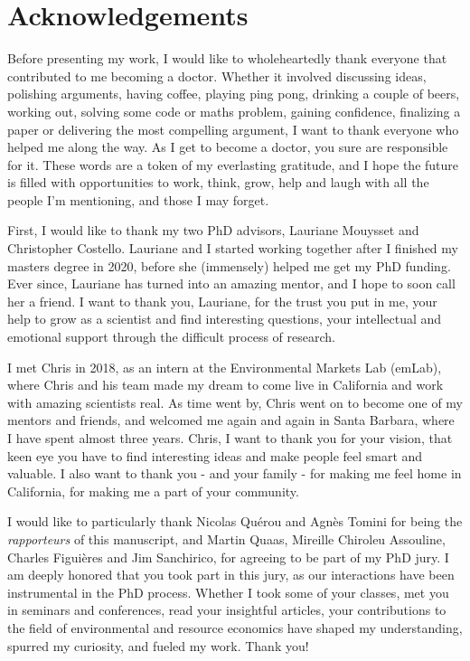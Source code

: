 \chapter*{Acknowledgements}
\onehalfspacing

Before presenting my work, I would like to wholeheartedly thank everyone that contributed to me becoming a doctor. Whether it involved discussing ideas, polishing arguments, having coffee, playing ping pong, drinking a couple of beers, working out, solving some code or maths problem, gaining confidence, finalizing a paper or delivering the most compelling argument, I want to thank everyone who helped me along the way. As I get to become a doctor, you sure are responsible for it. These words are a token of my everlasting gratitude, and I hope the future is filled with opportunities to work, think, grow, help and laugh with all the people I'm mentioning, and those I may forget. 

First, I would like to thank my two PhD advisors, Lauriane Mouysset and Christopher Costello. Lauriane and I started working together after I finished my masters degree in 2020, before she (immensely) helped me get my PhD funding. Ever since, Lauriane has turned into an amazing mentor, and I hope to soon call her a friend. I want to thank you, Lauriane, for the trust you put in me, your help to grow as a scientist and find interesting questions, your intellectual and emotional support through the difficult process of research. 

I met Chris in 2018, as an intern at the Environmental Markets Lab (emLab), where Chris and his team made my dream to come live in California and work with amazing scientists real. As time went by, Chris went on to become one of my mentors and friends, and welcomed me again and again in Santa Barbara, where I have spent almost three years. Chris, I want to thank you for your vision, that keen eye you have to find interesting ideas and make people feel smart and valuable. I also want to thank you - and your family - for making me feel home in California, for making me a part of your community.

I would like to particularly thank Nicolas Quérou and Agnès Tomini for being the \textit{rapporteurs} of this manuscript, and Martin Quaas, Mireille Chiroleu Assouline, Charles Figuières and Jim Sanchirico, for agreeing to be part of my PhD jury. I am deeply honored that you took part in this jury, as our interactions have been instrumental in the PhD process. Whether I took some of your classes, met you in seminars and conferences, read your insightful articles, your contributions to the field of environmental and resource economics have shaped my understanding, spurred my curiosity, and fueled my work. Thank you!

